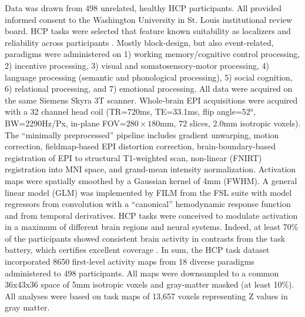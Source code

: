\documentclass[10pt, conference, compsocconf]{IEEEtran}
\begin{document}
Data was drawn from 498 unrelated, healthy HCP participants.
All provided informed consent to the Washington
University in St. Louis institutional review board. HCP tasks 
were selected that feature known suitability as localizers
and reliability
across participants \citep{barch2013}.
Mostly block-design, but also event-related, paradigms were
administered on 1) working memory/cognitive control processing, 2)
incentive processing, 3) visual and somatosensory-motor processing,
4) language processing (semantic and phonological processing),
5) social cognition, 6) relational processing, and 7) emotional
processing. All data were acquired on the same Siemens Skyra 3T scanner.
Whole-brain EPI acquisitions were acquired with a
32 channel head coil (TR=720ms, TE=33.1ms, flip angle=52°, BW=2290Hz/Px,
in-plane FOV=$280\times180$mm, 72 slices, 2.0mm isotropic voxels).
The “minimally preprocessed” pipeline \citep{glass13} includes
gradient unwarping, motion correction, fieldmap-based EPI distortion
correction, brain-boundary-based registration of EPI to structural
T1-weighted scan, non-linear (FNIRT) registration into MNI space,
and grand-mean intensity normalization. Activation maps were spatially
smoothed by a Gaussian kernel of 4mm (FWHM). A general linear model (GLM) was
implemented by FILM from the FSL suite with model regressors from convolution
with a “canonical” hemodynamic response function and from temporal derivatives.
HCP tasks were conceived to modulate activation
in a maximum of different brain regions and neural systems. Indeed, at
least 70\% of the participants showed consistent brain activity in
contrasts from the task battery, which certifies excellent
coverage \citep{barch2013}.
In sum, the HCP task dataset incorporated 8650 first-level activity maps
from 18 diverse paradigms administered to 498 participants.
All maps were downsampled to a common 36x43x36 space of
5mm isotropic voxels and gray-matter masked (at least 10\%).
All analyses were based on task maps of
13,657 voxels representing Z values in gray matter.
\linebreak
\end{document}
